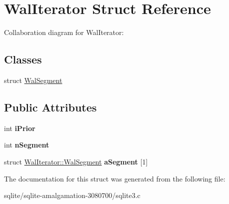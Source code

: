 \hypertarget{struct_wal_iterator}{\section{Wal\+Iterator Struct Reference}
\label{struct_wal_iterator}
}


Collaboration diagram for Wal\+Iterator\+:
\subsection*{Classes}
\begin{DoxyCompactItemize}
\item 
struct \hyperlink{struct_wal_iterator_1_1_wal_segment}{Wal\+Segment}
\end{DoxyCompactItemize}
\subsection*{Public Attributes}
\begin{DoxyCompactItemize}
\item 
\hypertarget{struct_wal_iterator_a2f906125490dd3e967fc53768b03abbb}{int {\bfseries i\+Prior}}\label{struct_wal_iterator_a2f906125490dd3e967fc53768b03abbb}

\item 
\hypertarget{struct_wal_iterator_ad81bc9447d6043212289d127dc9fdafa}{int {\bfseries n\+Segment}}\label{struct_wal_iterator_ad81bc9447d6043212289d127dc9fdafa}

\item 
\hypertarget{struct_wal_iterator_a6d3fcaaeeca5a0eee46f9fa7c3cb669b}{struct \hyperlink{struct_wal_iterator_1_1_wal_segment}{Wal\+Iterator\+::\+Wal\+Segment} {\bfseries a\+Segment} \mbox{[}1\mbox{]}}\label{struct_wal_iterator_a6d3fcaaeeca5a0eee46f9fa7c3cb669b}

\end{DoxyCompactItemize}


The documentation for this struct was generated from the following file\+:\begin{DoxyCompactItemize}
\item 
sqlite/sqlite-\/amalgamation-\/3080700/sqlite3.\+c\end{DoxyCompactItemize}
